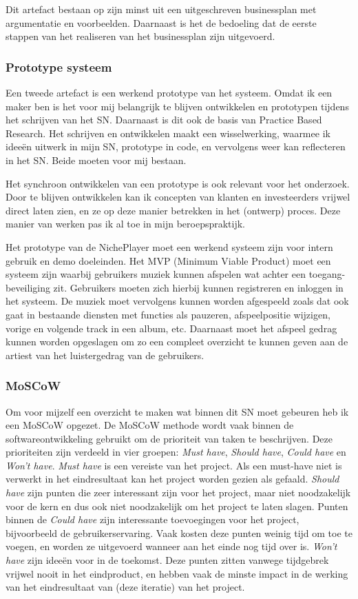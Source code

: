 Dit artefact bestaan op zijn minst uit een uitgeschreven businessplan met argumentatie en voorbeelden. Daarnaast is het de bedoeling dat de eerste stappen van het realiseren van het businessplan zijn uitgevoerd.

\subsubsection*{Prototype systeem}
Een tweede artefact is een werkend prototype van het systeem. Omdat ik een maker ben is het voor mij belangrijk te blijven ontwikkelen en prototypen tijdens het schrijven van het SN. Daarnaast is dit ook de basis van Practice Based Research. Het schrijven en ontwikkelen maakt een wisselwerking, waarmee ik ideeën uitwerk in mijn SN, prototype in code, en vervolgens weer kan reflecteren in het SN. Beide moeten voor mij bestaan.

Het synchroon ontwikkelen van een prototype is ook relevant voor het onderzoek. Door te blijven ontwikkelen kan ik concepten van klanten en investeerders vrijwel direct laten zien, en ze op deze manier betrekken in het (ontwerp) proces. Deze manier van werken pas ik al toe in mijn beroepspraktijk.

Het prototype van de NichePlayer moet een werkend systeem zijn voor intern gebruik en demo doeleinden. Het MVP (Minimum Viable Product) moet een systeem zijn waarbij gebruikers muziek kunnen afspelen wat achter een toegang-beveiliging zit. Gebruikers moeten zich hierbij kunnen registreren en inloggen in het systeem. De muziek moet vervolgens kunnen worden afgespeeld zoals dat ook gaat in bestaande diensten met functies als pauzeren, afspeelpositie wijzigen, vorige en volgende track in een album, etc. Daarnaast moet het afspeel gedrag kunnen worden opgeslagen om zo een compleet overzicht te kunnen geven aan de artiest van het luistergedrag van de gebruikers.

\subsubsection*{MoSCoW}
Om voor mijzelf een overzicht te maken wat binnen dit SN moet gebeuren heb ik een MoSCoW opgezet. De MoSCoW methode wordt vaak binnen de softwareontwikkeling gebruikt om de prioriteit van taken te beschrijven. Deze prioriteiten zijn verdeeld in vier groepen: \textit{Must have}, \textit{Should have}, \textit{Could have} en \textit{Won't have}. \textit{Must have} is een vereiste van het project. Als een must-have niet is verwerkt in het eindresultaat kan het project worden gezien als gefaald. \textit{Should have} zijn punten die zeer interessant zijn voor het project, maar niet noodzakelijk voor de kern en dus ook niet noodzakelijk om het project te laten slagen. Punten binnen de \textit{Could have} zijn interessante toevoegingen voor het project, bijvoorbeeld de gebruikerservaring. Vaak kosten deze punten weinig tijd om toe te voegen, en worden ze uitgevoerd wanneer aan het einde nog tijd over is. \textit{Won't have} zijn ideeën voor in de toekomst. Deze punten zitten vanwege tijdgebrek vrijwel nooit in het eindproduct, en hebben vaak de minste impact in de werking van het eindresultaat van (deze iteratie) van het project.

